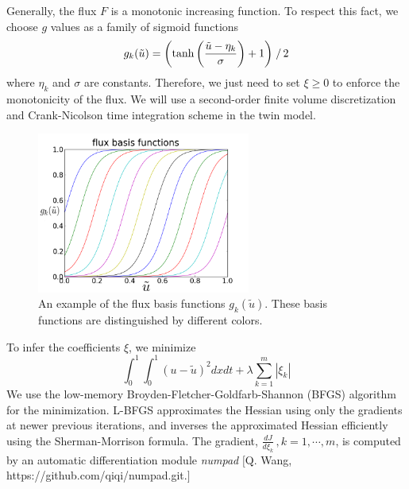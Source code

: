\documentclass{paper1}
\begin{document}
Generally, the flux $F$ is a monotonic increasing function. To respect this fact, we
choose $g$ values as a family of sigmoid functions 
\begin{equation}
    g_k(\tilde{u}) = \left(\tanh\left(\frac{\tilde{u}- \eta_k}{\sigma}\right)+1\right) \left.\right/2
    \label{sigmoids}
\end{equation}
where $\eta_k$ and $\sigma$ are constants. Therefore, we just need to set $\xi\ge 0 $ 
to enforce the monotonicity of the flux.
We will use  a second-order finite volume discretization and 
Crank-Nicolson time integration scheme in the twin model.
\begin{figure}\begin{center}
    \includegraphics[width=7cm]{fluxbasis.png}
    \caption{An example of the flux basis functions $g_k(\tilde{u})$. 
    These basis functions are distinguished by different colors.}
\end{center}\end{figure}

To infer the coefficients $\xi$, we minimize
\begin{equation}
    \int_0^1 \int_0^1 (u-\tilde{u})^2 dx dt+ \lambda \sum_{k=1}^m |\xi_k|
\end{equation}
We use the {low-memory Broyden-Fletcher-Goldfarb-Shannon} (BFGS) algorithm
\cite{LBFGS} for the minimization. 
L-BFGS approximates the Hessian using only the gradients at newer previous iterations,
and inverses the approximated Hessian efficiently using the Sherman-Morrison formula.
The gradient, $\frac{dJ}{d\xi_k}\,, k=1,\cdots, m$, 
is computed by an automatic differentiation module \textit{numpad} 
$[$Q. Wang, https://github.com/qiqi/numpad.git.$]$\\
\end{document}
